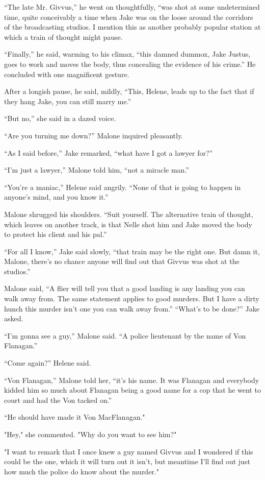 \documentclass{novel}
\begin{document}
“The late Mr. Givvus,” he went on thoughtfully, “was shot at some undetermined time, quite conceivably a time when Jake was on the loose around the corridors of the broadcasting studios. I mention this as another probably popular station at which a train of thought might pause.

“Finally,” he said, warming to his climax, “this damned dummox, Jake Justus, goes to work and moves the body, thus concealing the evidence of his crime.” He concluded with one magnificent gesture.

After a longish pause, he said, mildly, “This, Helene, leads up to the fact that if they hang Jake, you can still marry me.”

“But no,” she said in a dazed voice.

“Are you turning me down?” Malone inquired pleasantly.

“As I said before,” Jake remarked, “what have I got a lawyer for?”

“I’m just a lawyer,” Malone told him, “not a miracle man.”

“You’re a maniac,” Helene said angrily. “None of that is going to happen in anyone’s mind, and you know it.”

Malone shrugged his shoulders. “Suit yourself. The alternative train of thought, which leaves on another track, is that Nelle shot him and Jake moved the body to protect his client and his pal.”

“For all I know,” Jake said slowly, “that train may be the right one. But damn it, Malone, there’s no chance anyone will find out that Givvus was shot at the studios.”

Malone said, “A flier will tell you that a good landing is any landing you can walk away from. The same statement applies to good murders. But I have a dirty hunch this murder isn’t one you can walk away from.” “What’s to be done?” Jake asked.

“I’m gonna see a guy,” Malone said. “A police lieutenant by the name of Von Flanagan.”

“Come again?” Helene said.

“Von Flanagan,” Malone told her, “it’s his name. It was Flanagan and everybody kidded him so much about Flanagan being a good name for a cop that he went to court and had the Von tacked on.”

“He should have made it Von MacFlanagan."

"Hey," she commented. "Why do you want to see him?"

"I want to remark that I once knew a guy named Givvus and I wondered if this could be the one, which it will turn out it isn't, but meantime I'll find out just how much the police do know about the murder."
\end{document}
